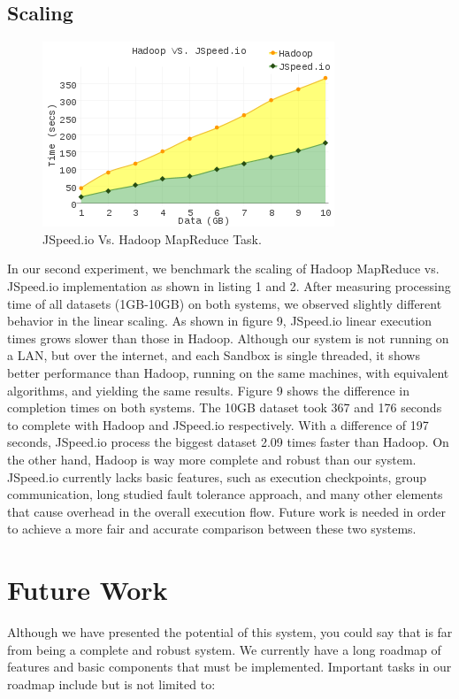 \documentclass[10pt,reprint]{socc14}
\begin{document}
\subsection{Scaling}
\begin{figure}[h]	
	\centering
	\includegraphics[scale=2.8]{Hadoop_VS_JSpeedio}
	\caption{JSpeed.io Vs. Hadoop MapReduce Task.}
\end{figure}

In our second experiment, we benchmark the scaling of Hadoop MapReduce vs. JSpeed.io implementation as shown in listing 1 and 2. After measuring processing time of all datasets (1GB-10GB) on both systems, we observed slightly different behavior in the linear scaling. As shown in figure 9, JSpeed.io linear execution times grows slower than those in Hadoop. Although our system is not running on a LAN, but over the internet, and each Sandbox is single threaded, it shows better performance than Hadoop, running on the same machines, with equivalent algorithms, and yielding the same results. Figure 9 shows the difference in completion times on both systems. The 10GB dataset took 367 and 176 seconds to complete with Hadoop and JSpeed.io respectively. With a difference of 197 seconds, JSpeed.io process the biggest dataset 2.09 times faster than Hadoop. On the other hand, Hadoop is way more complete and robust than our system. JSpeed.io currently lacks basic features, such as execution checkpoints, group communication, long studied fault tolerance approach, and many other elements that cause overhead in the overall execution flow. Future work is needed in order to achieve a more fair and accurate comparison between these two systems.


\section{Future Work}

Although we have presented the potential of this system, you could say that is far from being a complete and robust system. We currently have a long roadmap of features and basic components that must be implemented. Important tasks in our roadmap include but is not limited to:
\end{document}
